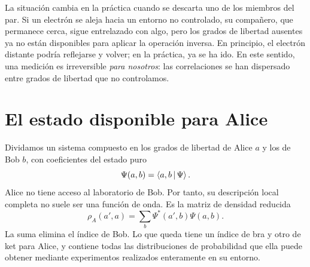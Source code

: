 La situación cambia en la práctica cuando se descarta uno de los miembros del par. Si un electrón se aleja hacia un entorno no controlado, su compañero, que permanece cerca, sigue entrelazado con algo, pero los grados de libertad ausentes ya no están disponibles para aplicar la operación inversa. En principio, el electrón distante podría reflejarse y volver; en la práctica, ya se ha ido. En este sentido, una medición es irreversible \emph{para nosotros}: las correlaciones se han dispersado entre grados de libertad que no controlamos.

\begin{classroomqa}
\end{classroomqa}

\begin{classroomqa}
\end{classroomqa}

\section{El estado disponible para Alice}

Dividamos un sistema compuesto en los grados de libertad de Alice \(a\) y los de Bob \(b\), con coeficientes del estado puro
\begin{equation}
\Psi(a,b)=\left\langle a,b\,\middle|\,\Psi\right\rangle.
\end{equation}
Alice no tiene acceso al laboratorio de Bob. Por tanto, su descripción local completa no suele ser una función de onda. Es la matriz de densidad reducida
\begin{equation}
\rho_A(a',a)
=
\sum_b \Psi^*(a',b)\Psi(a,b).
\label{eq:l8-reduced-density}
\end{equation}
La suma elimina el índice de Bob. Lo que queda tiene un índice de bra y otro de ket para Alice, y contiene todas las distribuciones de probabilidad que ella puede obtener mediante experimentos realizados enteramente en su entorno.

